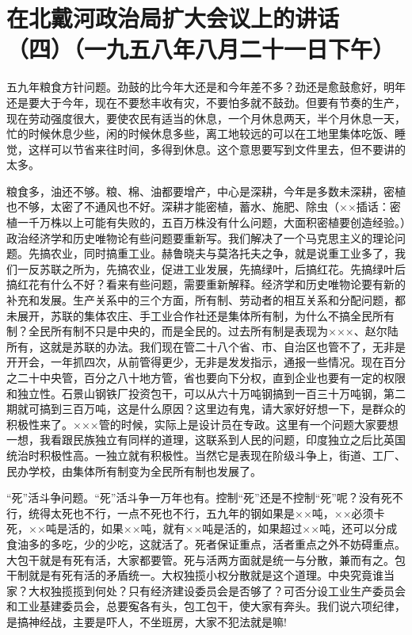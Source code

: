 \section[在北戴河政治局扩大会议上的讲话（四）（一九五八年八月二十一日下午）]{在北戴河政治局扩大会议上的讲话（四）（一九五八年八月二十一日下午）}


五九年粮食方针问题。劲鼓的比今年大还是和今年差不多？劲还是愈鼓愈好，明年还是要大于今年，现在不要愁丰收有灾，不要怕多就不鼓劲。但要有节奏的生产，现在劳动强度很大，要使农民有适当的休息，一个月休息两天，半个月休息一天，忙的时候休息少些，闲的时候休息多些，离工地较远的可以在工地里集体吃饭、睡觉，这样可以节省来往时间，多得到休息。这个意思要写到文件里去，但不要讲的太多。

粮食多，油还不够。粮、棉、油都要增产，中心是深耕，今年是多数未深耕，密植也不够，太密了不通风也不好。深耕才能密植，蓄水、施肥、除虫（××插话：密植一千万株以上可能有失败的，五百万株没有什么问题，大面积密植要创造经验。）政治经济学和历史唯物论有些问题要重新写。我们解决了一个马克思主义的理论问题。先搞农业，同时搞重工业。赫鲁晓夫与莫洛托夫之争，就是说重工业多了，我们一反苏联之所为，先搞农业，促进工业发展，先搞绿叶，后搞红花。先搞绿叶后搞红花有什么不好？看来有些问题，需要重新解释。经济学和历史唯物论要有新的补充和发展。生产关系中的三个方面，所有制、劳动者的相互关系和分配问题，都未展开，苏联的集体农庄、手工业合作社还是集体所有制，为什么不搞全民所有制？全民所有制不只是中央的，而是全民的。过去所有制是表现为×××、赵尔陆所有，这就是苏联的办法。我们现在管二十八个省、市、自治区也管不了，无非是开开会，一年抓四次，从前管得更少，无非是发发指示，通报一些情况。现在百分之二十中央管，百分之八十地方管，省也要向下分权，直到企业也要有一定的权限和独立性。石景山钢铁厂投资包干，可以从六十万吨钢搞到一百三十万吨钢，第二期就可搞到三百万吨，这是什么原因？这里边有鬼，请大家好好想一下，是群众的积极性来了。×××管的时候，实际上是设计员在专政。这里有一个问题大家要想一想，我看跟民族独立有同样的道理，这联系到人民的问题，印度独立之后比英国统治时积极性高。一独立就有积极性。当然它是表现在阶级斗争上，街道、工厂、民办学校，由集体所有制变为全民所有制也发展了。

“死”活斗争问题。“死”活斗争一万年也有。控制“死”还是不控制“死”呢？没有死不行，统得太死也不行，一点不死也不行，五九年的钢如果是××吨，××必须卡死，××吨是活的，如果××吨，就有××吨是活的，如果超过××吨，还可以分成食油多的多吃，少的少吃，这就活了。死者保证重点，活者重点之外不妨碍重点。大包干就是有死有活，大家都要管。死与活两方面就是统一与分散，兼而有之。包干制就是有死有活的矛盾统一。大权独揽小权分散就是这个道理。中央究竟谁当家？大权独揽揽到何处？只有经济建设委员会是否够了？可否分设工业生产委员会和工业基建委员会，总要寃各有头，包工包干，使大家有奔头。我们说六项纪律，是搞神经战，主要是吓人，不坐班房，大家不犯法就是嘛!

